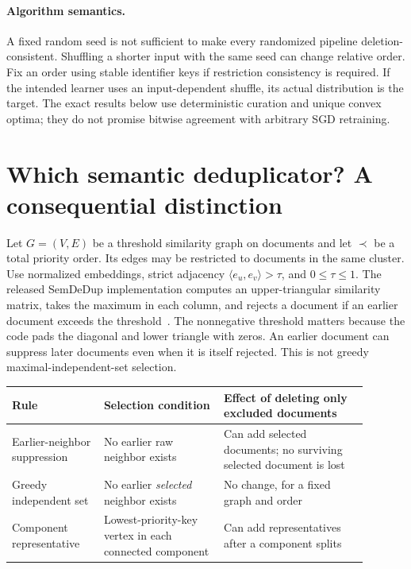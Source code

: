 \documentclass[11pt,a4paper]{article}
\theoremstyle{definition}\newtheorem{definition}[theorem]{Definition}
\begin{document}
\paragraph{Algorithm semantics.} A fixed random seed is not sufficient to make every randomized pipeline deletion-consistent. Shuffling a shorter input with the same seed can change relative order. Fix an order using stable identifier keys if restriction consistency is required. If the intended learner uses an input-dependent shuffle, its actual distribution is the target. The exact results below use deterministic curation and unique convex optima; they do not promise bitwise agreement with arbitrary SGD retraining.

\section{Which semantic deduplicator? A consequential distinction}
Let $G=(V,E)$ be a threshold similarity graph on documents and let $\prec$ be a total priority order. Its edges may be restricted to documents in the same cluster. Use normalized embeddings, strict adjacency $\langle e_u,e_v\rangle>\tau$, and $0\le\tau\le1$. The released SemDeDup implementation computes an upper-triangular similarity matrix, takes the maximum in each column, and rejects a document if an earlier document exceeds the threshold~\cite{semdedup,semcode}. The nonnegative threshold matters because the code pads the diagonal and lower triangle with zeros. An earlier document can suppress later documents even when it is itself rejected. This is not greedy maximal-independent-set selection.

\begin{center}\small
\begin{tabular}{p{0.23\linewidth}p{0.30\linewidth}p{0.36\linewidth}}
\toprule
Rule & Selection condition & Effect of deleting only excluded documents\\
\midrule
Earlier-neighbor suppression & No earlier raw neighbor exists & Can add selected documents; no surviving selected document is lost\\
Greedy independent set & No earlier \emph{selected} neighbor exists & No change, for a fixed graph and order\\
Component representative & Lowest-priority-key vertex in each connected component & Can add representatives after a component splits\\
\bottomrule
\end{tabular}
\end{center}
\end{document}
